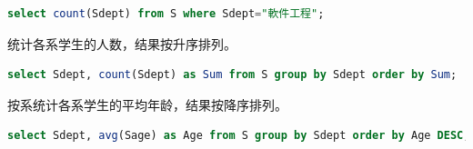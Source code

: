 \documentclass[12pt, a4paper]{report}
\begin{document}
\begin{lstlisting}[language=SQL]
    select count(Sdept) from S where Sdept="軟件工程";
\end{lstlisting}

\begin{figure}[H] %
    \centering %
\end{figure}

统计各系学生的人数，结果按升序排列。\\

\begin{lstlisting}[language=SQL]
    select Sdept, count(Sdept) as Sum from S group by Sdept order by Sum;
\end{lstlisting}

\begin{figure}[H] %
    \centering %
\end{figure}

按系统计各系学生的平均年龄，结果按降序排列。\\

\begin{lstlisting}[language=SQL]
    select Sdept, avg(Sage) as Age from S group by Sdept order by Age DESC;
\end{lstlisting}

\begin{figure}[H] %
    \centering %
\end{figure}
\end{document}
